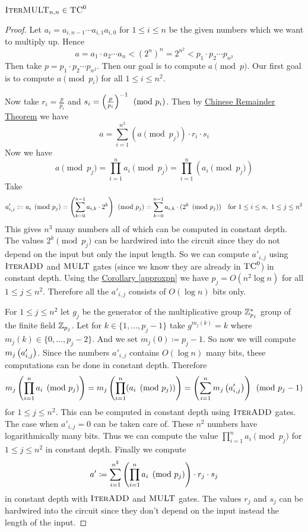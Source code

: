 \begin{theorem}
	$\textsc{IterMULT}_{n,n}\in \textsc{TC}^0$
\end{theorem}
\begin{proof}
	Let $a_i=a_{i,n-1}\cdots a_{i,1}a_{i,0}$ for $1\leq i\leq n$ be the given numbers which we want to multiply up. Hence $$a=a_1\cdot a_2\cdots a_n<  (2^n)^n=2^{n^2}<p_1\cdot p_2\cdots p_{n^2}$$Then take $p=p_1\cdot p_2\cdots p_{n^2}$. Then our goal is to compute $a\pmod{p}$. Our first goal is to compute $a\pmod{p_i}$ for all $1\leq i\leq n^2$. 
	
	Now take $r_i=\frac{p}{p_i}$ and $s_i=\left(\frac{p}{p_i}\right)^{-1}\pmod{p_i}$. Then by \hyperref[crt]{Chinese Remainder Theorem} we have $$a=\sum_{i=1}^{n^2}(a\pmod{p_j}) \cdot r_i\cdot s_i$$ Now we have $$a\pmod{p_j}=\prod_{i=1}^na_i\pmod{p_j}=\prod_{i=1}^n (a_i\pmod{p_j})$$Take $$a'_{i,j}\coloneqq a_i\pmod{p_j}=\left(\sum_{k=0}^{n-1}a_{i,k}\cdot  2^k\right)\pmod{p_j}= \sum_{k=0}^{n-1}a_{i,k}\cdot  (2^k\pmod{p_j})\quad\text{for }1\leq i\leq n,\ 1\leq j\leq n^2$$This gives $n^3$ many numbers all of which can be computed in constant depth. The values $2^k\pmod{p_j}$ can be hardwired into the circuit since they do not depend on the input but only the input length. So we can compute $a'_{i,j}$ using $\textsc{IterADD}$ and $\textsc{MULT}$ gates (since we know they are already in $\textsc{TC}^0$) in constant depth. Using the \hyperref[approxpn]{Corollary \ref{approxpn}} we have $p_j=O(n^2\log n)$ for all $1\leq j\leq n^2$. Therefore all the $a'_{i,j}$ consists of $O(\log n)$ bits only.
	
	For $1\leq j\leq n^2$ let $g_j$ be the generator of the multiplicative group $\mathbb{Z}^*_{p_j}$ group of the finite field $\mathbb{Z}_{p_j}$. Let for $k\in \{1,\dots, p_j-1\}$ take $g^{m_j(k)}=k$ where $m_j(k)\in \{0,\dots, p_j-2\}$. And we set $m_j(0)\coloneqq p_j-1$. So now we will compute $m_j\left(a'_{i,j}\right)$. Since the numbers $a'_{i,j}$ contains $O(\log n)$ many bits, these computations can be done in constant depth. Therefore $$m_j\left( \prod_{i=1}^{n}a_i \pmod{p_j} \right)=m_j\left( \prod_{i=1}^{n}(a_i \pmod{p_j}) \right)=\left( \sum_{i=1}^n m_j\left(a'_{i,j}\right) \right)\pmod{p_j-1}$$ for $1\leq j\leq n^2$. This can be computed in constant depth using $\textsc{IterADD}$ gates. The case when $a'_{i,j}=0$ can be taken care of. These $n^2$ numbers have logarithmically many bits. Thus we can compute the value $\prod\limits_{i=1}^n a_i\pmod{p_j}$ for $1\leq j\leq n^2$ in constant depth. Finally we compute $$a'\coloneqq \sum_{i=1}^{n^2}\left( \prod\limits_{i=1}^n a_i\pmod{p_j} \right)\cdot r_j\cdot s_j$$ in constant depth with $\textsc{IterADD}$ and $\textsc{MULT}$ gates. The values $r_j$ and $s_j$ can be hardwired into the circuit since they don't depend on the input instead the length of the input.
	

\end{proof}
